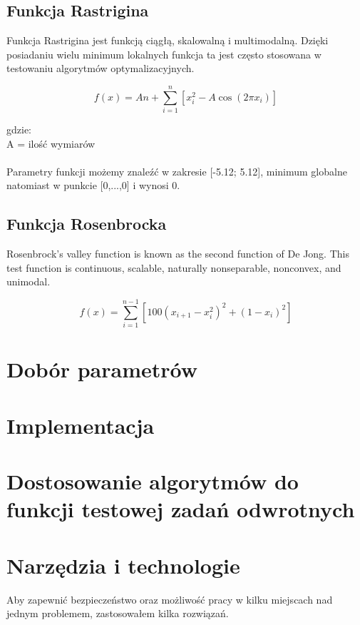 \documentclass[12pt]{report}
\newcommand{\newLine}{~\\}
\newcommand{\si}{ś}
\begin{document}
{		\section{Funkcja Rastrigina}
Funkcja Rastrigina jest funkcją ciągłą, skalowalną i multimodalną. Dzięki posiadaniu wielu minimum lokalnych funkcja ta jest często stosowana w testowaniu algorytmów optymalizacyjnych. 

\[f(x) = An + \sum_{i=1}^{n} [x_i^2 - A \cos{(2 \pi x_i)}] \]

gdzie: \\
A = ilo\si ć wymiarów \\ \newLine
Parametry funkcji możemy znaleźć w zakresie [-5.12; 5.12], minimum globalne natomiast w punkcie [0,...,0] i wynosi 0.

		\section{Funkcja Rosenbrocka}
Rosenbrock's valley function is known as the second function of De Jong. This test function is continuous, scalable, naturally nonseparable, nonconvex, and unimodal.


\[f(x) = \sum_{i=1}^{n-1} [100(x_{i+1} - x_i^2)^2 + (1- x_i)^2 ]\]

	\chapter{Dobór parametrów}

	\chapter{Implementacja}

	\chapter{Dostosowanie algorytmów do funkcji testowej zadań odwrotnych}

	\chapter{Narzędzia i technologie}
Aby zapewnić bezpieczeństwo oraz możliwo\si ć pracy w kilku miejscach nad jednym problemem, zastosowałem kilka rozwiązań.
}
\end{document}
